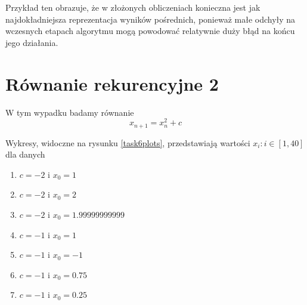 \documentclass{article}
\begin{document}
Przykład ten obrazuje, że w złożonych obliczeniach konieczna jest jak najdokładniejsza reprezentacja wyników pośrednich, ponieważ małe odchyły na wczesnych etapach algorytmu mogą powodować relatywnie duży błąd na końcu jego działania.

\section{Równanie rekurencyjne 2}

W tym wypadku badamy równanie
$$
x_{n+1} = x_n^2 + c
$$

Wykresy, widoczne na rysunku \ref{task6plots}, przedstawiają wartości $x_i : i \in [1,40]$ dla danych
\begin{enumerate}
  \item $c=-2$ i $x_0=1$
  \item $c=-2$ i $x_0=2$
  \item $c=-2$ i $x_0=1.99999999999$
  \item $c=-1$ i $x_0=1$
  \item $c=-1$ i $x_0=-1$
  \item $c=-1$ i $x_0=0.75$
  \item $c=-1$ i $x_0=0.25$
\end{enumerate}
\end{document}
